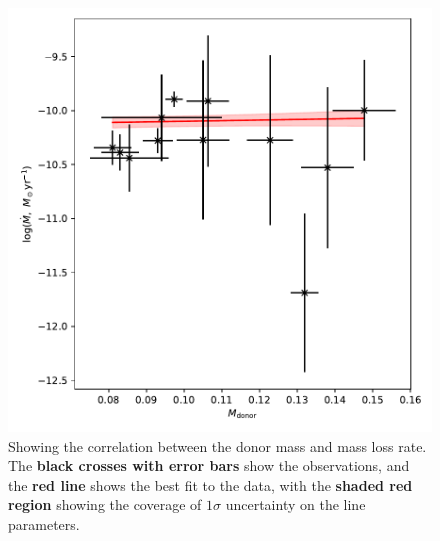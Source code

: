 \begin{figure}
    \centering
    \includegraphics[width=\textwidth]{figures/results/Mdot/Mr_Mdot-chopped_MCMC_both-errs_fit.pdf}
    \caption{Showing the correlation between the donor mass and mass loss rate. The {\bf black crosses with error bars} show the observations, and the {\bf red line} shows the best fit to the data, with the {\bf shaded red region} showing the coverage of $1\sigma$ uncertainty on the line parameters.}
    \label{fig:discussion:donor mass vs Mdot fit}
\end{figure}

